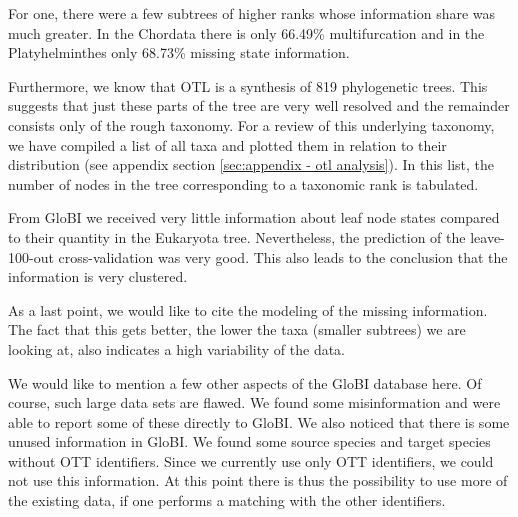     For one, there were a few subtrees of higher ranks whose information share was much greater. In 
      the Chordata there is only 66.49\% multifurcation and in the Platyhelminthes only 68.73\% 
      missing state information.

    Furthermore, we know that OTL is a synthesis of 819 phylogenetic trees. This suggests that just 
      these parts of the tree are very well resolved and the remainder consists only of the rough 
      taxonomy. For a review of this underlying taxonomy, we have compiled a list of all taxa and 
      plotted them in relation to their distribution (see appendix section \ref{sec:appendix - otl analysis}). 
      In this list, the number of nodes in the tree corresponding to a taxonomic rank is tabulated.

    
    From GloBI we received very little information about leaf node states compared to their quantity 
      in the Eukaryota tree. Nevertheless, the prediction of the leave-100-out cross-validation was 
      very good. This also leads to the conclusion that the information is very clustered.

    As a last point, we would like to cite the modeling of the missing information. The fact that this 
      gets better, the lower the taxa (smaller subtrees) we are looking at, also indicates a high 
      variability of the data.

    We would like to mention a few other aspects of the GloBI database here. Of course, such large 
      data sets are flawed. We found some misinformation and were able to report some of these 
      directly to GloBI. We also noticed that there is some unused information in GloBI. We found some 
      source species and target species without OTT identifiers. Since we currently use only OTT 
      identifiers, we could not use this information. At this point there is thus the possibility to 
      use more of the existing data, if one performs a matching with the other identifiers.

